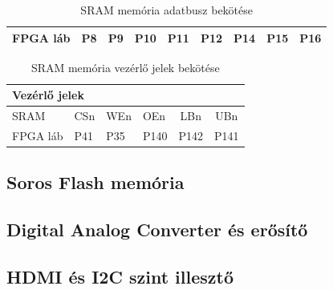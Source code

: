 \begin{table}[H]
\begin{tabular}{|lcccccccc|}
			\multicolumn{1}{|l|}{FPGA láb}                                                & \multicolumn{1}{c|}{P8}                                                 & \multicolumn{1}{c|}{P9}                                                 & \multicolumn{1}{c|}{P10}                                                & \multicolumn{1}{c|}{P11}                                                & \multicolumn{1}{c|}{P12}                                                & \multicolumn{1}{c|}{P14}                                                & \multicolumn{1}{c|}{P15}                                                & P16                        \\ \hline
		\end{tabular}
		\caption{SRAM memória adatbusz bekötése}
		\label{tab:FPGA-DATA-SRAMpin}
	\end{table}

	\begin{table}[H]
		\footnotesize
		\centering
		\begin{tabular}{|llllcc|}
			\hline
			\multicolumn{6}{|l|}{\cellcolor[HTML]{C0C0C0}\textbf{Vezérlő jelek}}                                                                                \\ \hline
			\multicolumn{1}{|l|}{SRAM}     & \multicolumn{1}{l|}{CSn} & \multicolumn{1}{l|}{WEn} & \multicolumn{1}{l|}{OEn}  & \multicolumn{1}{c|}{LBn}  & UBn  \\ \hline
			\multicolumn{1}{|l|}{FPGA láb} & \multicolumn{1}{l|}{P41} & \multicolumn{1}{l|}{P35} & \multicolumn{1}{l|}{P140} & \multicolumn{1}{c|}{P142} & P141 \\ \hline
		\end{tabular}
		\caption{SRAM memória vezérlő jelek bekötése}
		\label{tab:FPGA-CONTROL-SRAMpin}
	\end{table}

	
	\subsection{Soros Flash memória}
	
	\subsection{Digital Analog Converter és erősítő}
	
	\subsection{HDMI és I2C szint illesztő}
	
